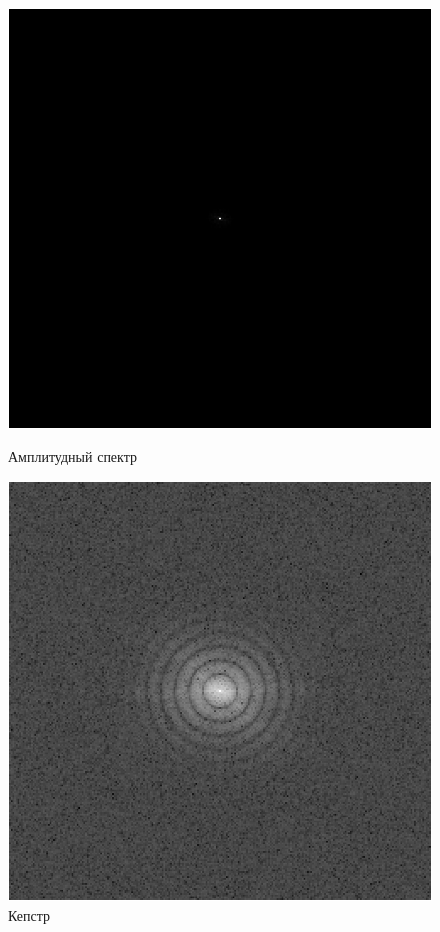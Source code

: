 \begin{figure}[!htb]
	\begin{minipage}{0.5\textwidth}
		\centering
		\includegraphics[scale=0.5]{assets/d2}
		\caption{Амплитудный спектр}\label{spect}
	\end{minipage}
	\begin{minipage}{0.5\textwidth}
		\centering
		\includegraphics[scale=0.5]{assets/d1}
		\caption{Кепстр}\label{ceps}
	\end{minipage}
\end{figure}

